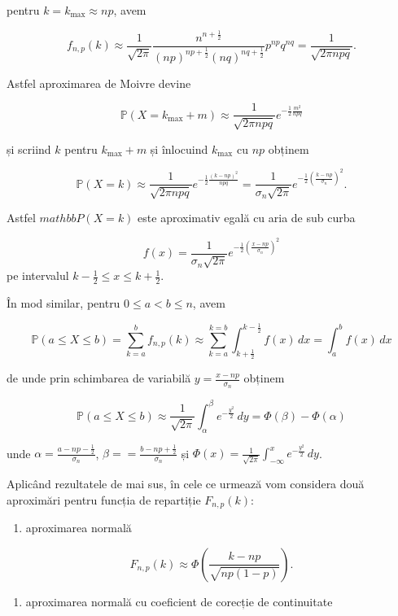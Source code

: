 \documentclass[]{article}
\providecommand{\tightlist}{%
  \setlength{\itemsep}{0pt}\setlength{\parskip}{0pt}}
\begin{document}
pentru \(k = k_{\max}\approx np\), avem

\[
f_{n,p}(k)\approx \frac{1}{\sqrt{2\pi}}\frac{n^{n+\frac{1}{2}}}{(np)^{np+\frac{1}{2}}(nq)^{nq+\frac{1}{2}}}p^{np}q^{nq}= \frac{1}{\sqrt{2\pi npq}}.
\]

Astfel aproximarea de Moivre devine

\[
  \mathbb{P}(X=k_{\max}+m)\approx \frac{1}{\sqrt{2\pi npq}}e^{-\frac{1}{2}\frac{m^2}{npq}}
\]

și scriind \(k\) pentru \(k_{\max}+m\) și înlocuind \(k_{\max}\) cu
\(np\) obținem

\[
  \mathbb{P}(X=k)\approx \frac{1}{\sqrt{2\pi npq}}e^{-\frac{1}{2}\frac{(k-np)^2}{npq}} = \frac{1}{\sigma_n\sqrt{2\pi}}e^{-\frac{1}{2}\left(\frac{k-np}{\sigma_n}\right)^2}.
\]

Astfel \(mathbb{P}(X=k)\) este aproximativ egală cu aria de sub curba

\[
  f(x) = \frac{1}{\sigma_n\sqrt{2\pi}}e^{-\frac{1}{2}\left(\frac{x-np}{\sigma_n}\right)^2}
\] pe intervalul \(k-\frac{1}{2}\leq x\leq k+\frac{1}{2}\).

În mod similar, pentru \(0\leq a< b\leq n\), avem

\[
  \mathbb{P}(a\leq X\leq b) = \sum_{k=a}^{b}f_{n,p}(k) \approx \sum_{k=a}^{k=b}\int_{k+\frac{1}{2}}^{k-\frac{1}{2}}f(x)\,dx = \int_{a}^{b}f(x)\,dx
\]

de unde prin schimbarea de variabilă \(y = \frac{x-np}{\sigma_n}\)
obținem

\[
  \mathbb{P}(a\leq X\leq b)\approx \frac{1}{\sqrt{2\pi}}\int_{\alpha}^{\beta}e^{-\frac{y^2}{2}}\,dy = \Phi(\beta) - \Phi(\alpha)
\]

unde \(\alpha = \frac{a-np-\frac{1}{2}}{\sigma_n}\),
\(\beta = = \frac{b-np+\frac{1}{2}}{\sigma_n}\) și
\(\Phi(x)=\frac{1}{\sqrt{2\pi}}\int_{-\infty}^{x}e^{-\frac{y^2}{2}}\,dy\).

Aplicând rezultatele de mai sus, în cele ce urmează vom considera două
aproximări pentru funcția de repartiție \(F_{n,p}(k)\):

\begin{enumerate}
\def\labelenumi{\alph{enumi})}
\tightlist
\item
  aproximarea normală
\end{enumerate}

\[
F_{n,p}(k) \approx \Phi\left(\frac{k-np}{\sqrt{np(1-p)}}\right).
\]

\begin{enumerate}
\def\labelenumi{\alph{enumi})}
\setcounter{enumi}{1}
\tightlist
\item
  aproximarea normală cu coeficient de corecție de continuitate
\end{enumerate}
\end{document}
